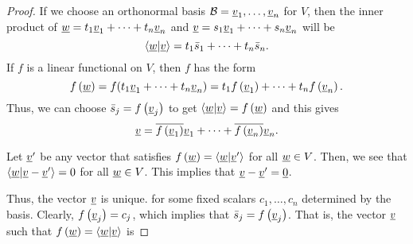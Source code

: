 \begin{proof}
If we choose an orthonormal basis $\mathcal{B} = \underline{v}_1, \ldots, \underline{v}_n$ for $V$, then the inner product of $\underline{w} = t_1 \underline{v}_1 + \cdots + t_n \underline{v}_n$ and $\underline{v} = s_1 \underline{v}_1 + \cdots + s_n \underline{v}_n$ will be
\begin{equation*}
\left\langle \underline{w} | \underline{v} \right\rangle = t_1 \bar{s}_1 + \cdots + t_n \bar{s}_n .
\end{equation*}
If $f$ is a linear functional on $V$, then $f$ has the form
\begin{equation*}
f \left(\underline{w}\right) = f(t_1 \underline{v}_1 + \cdots + t_n \underline{v}_n) = t_1 f \left( \underline{v}_1 \right) + \cdots + t_n f \left( \underline{v}_n \right).
\end{equation*}
Thus, we can choose $\bar{s}_j = f \left( \underline{v}_j \right)$ to get $ \left\langle \underline{w} | \underline{v} \right\rangle = f \left( \underline{w} \right)$ and this gives
\begin{equation*}
\underline{v} = \overline{ f \left( \underline{v}_1 \right) } \underline{v}_1 + \cdots + \overline{ f \left( \underline{v}_n \right) } \underline{v}_n .
\end{equation*}

Let $\underline{v}'$ be any vector that satisfies $f \left( \underline{w} \right) = \left\langle \underline{w} | \underline{v}' \right\rangle$ for all $\underline{w}\in V$.
Then, we see that $\left\langle \underline{w} | \underline{v} - \underline{v}' \right\rangle = 0$
for all $\underline{w}\in V$.
This implies that $\underline{v}-\underline{v}' = \underline{0}$.

\iffalse

Thus, the vector $\underline{v}$ is unique.
 for some fixed scalars $c_1, \ldots, c_n$ determined by the basis.
Clearly, $f \left( \underline{v}_j \right) = c_j$, which implies that $\bar{s}_j = f \left( \underline{v}_j \right)$.
That is, the vector $\underline{v}$ such that $f \left( \underline{w} \right) = \left\langle \underline{w} | \underline{v} \right\rangle$ is


\end{proof}
